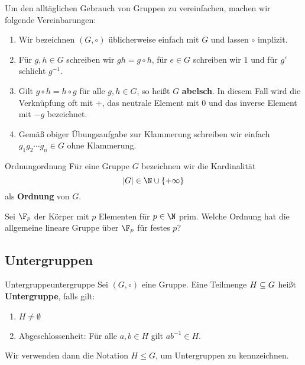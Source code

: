\begin{bemerkung}
Um den alltäglichen Gebrauch von Gruppen zu vereinfachen, machen wir folgende Vereinbarungen:
\begin{enumerate}
\item Wir bezeichnen $(G, \circ)$ üblicherweise einfach mit $G$ und lassen $\circ$ implizit.
\item Für $g,h \in G$ schreiben wir $gh = g \circ h$, für $e \in G$ schreiben wir $1$ und für $g'$ schlicht $g^{-1}$.
\item Gilt $g \circ h = h \circ g$ für alle $g,h \in G$, so heißt $G$ \textbf{abelsch}. In diesem Fall wird die Verknüpfung oft mit $+$, das neutrale Element mit $0$ und das inverse Element mit $-g$ bezeichnet.
\item Gemäß obiger Übungsaufgabe zur Klammerung schreiben wir einfach $g_1 g_2 \cdots g_n \in G$ ohne Klammerung.
\end{enumerate}
\end{bemerkung}
\begin{definition}{Ordnung}{ordnung}
Für eine Gruppe $G$ bezeichnen wir die Kardinalität \begin{equation}
|G| \in \N \cup \{+\infty \}
\end{equation}
als \textbf{Ordnung} von $G$.
\end{definition}
\begin{übung}
Sei $\F_p$ der Körper mit $p$ Elementen für $p \in \N$ prim. Welche Ordnung hat die allgemeine lineare Gruppe über $\F_p$ für festes $p$? 
\end{übung}
\subsection{Untergruppen}
\label{subsec:untergruppen}
\begin{definition}{Untergruppe}{untergruppe}
Sei $(G, \circ)$ eine Gruppe. Eine Teilmenge $H \subseteq G$ heißt \textbf{Untergruppe}, falls gilt:
\begin{enumerate}[({U}1)]
\item $H \neq \emptyset$
\item Abgeschlossenheit: Für alle $a, b \in H$ gilt $ab^{-1} \in H$.
\end{enumerate}
Wir verwenden dann die Notation $H \leq G$, um Untergruppen zu kennzeichnen.
\end{definition}

